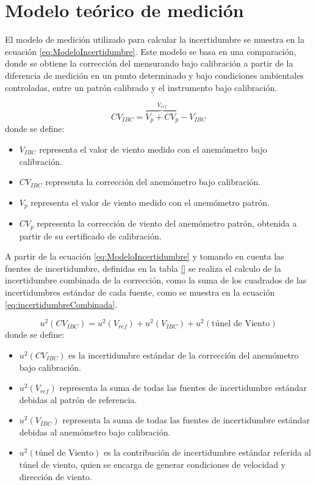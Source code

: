 
\section{Modelo teórico de medición}\label{sec:modelo_teoricos}

El modelo de medición utilizado para calcular la incertidumbre se muestra en la ecuación \ref{eq:ModeloIncertidumbre}. Este modelo se basa en una comparación, donde se obtiene la corrección del mensurando bajo calibración a partir de la diferencia de medición en un punto determinado y bajo condiciones ambientales controladas, entre un patrón calibrado y el instrumento bajo calibración.

\begin{equation}
    CV_{IBC} = \overbrace{V_{p} + CV_{p}}^{V_{ref}} - V_{IBC}
    \label{eq:ModeloIncertidumbre}
\end{equation}
donde se define:

\begin{itemize}
    \item $V_{IBC}$ representa el valor de viento medido con el anemómetro bajo calibración.
    \item $CV_{IBC}$ representa la corrección del anemómetro bajo calibración.
    \item $V_{p}$ representa el valor de viento medido con el anemómetro patrón.
    \item $CV_{p}$ representa la corrección de viento del anemómetro patrón, obtenida a partir de su certificado de calibración.
\end{itemize}

A partir de la ecuación \ref{eq:ModeloIncertidumbre} y tomando en cuenta las fuentes de incertidumbre, definidas en la tabla \ref{} se realiza el calculo de la incertidumbre combinada de la corrección, como la suma de los cuadrados de las incertidumbres estándar de cada fuente, como se muestra en la ecuación \ref{eq:incertidumbreCombinada}.

\begin{equation}
    u^{2}(CV_{IBC}) = u^{2}(V_{ref})+u^{2}(V_{IBC})+u^{2}(\text{túnel de Viento})
    \label{eq:incertidumbreCombinada}
\end{equation}
donde se define:

\begin{itemize}
    \item $u^{2}(CV_{IBC})$ es la incertidumbre estándar de la corrección del anemómetro bajo calibración.
    \item $u^{2}(V_{ref})$ representa la suma de todas las fuentes de incertidumbre estándar debidas al patrón de referencia.
    \item $u^{2}(V_{IBC})$ representa la suma de todas las fuentes de incertidumbre estándar debidas al anemómetro bajo calibración.
    \item $u^{2}(\text{túnel de Viento})$ es la contribución de incertidumbre estándar referida al túnel de viento, quien se encarga de generar condiciones de velocidad y dirección de viento.
\end{itemize}


